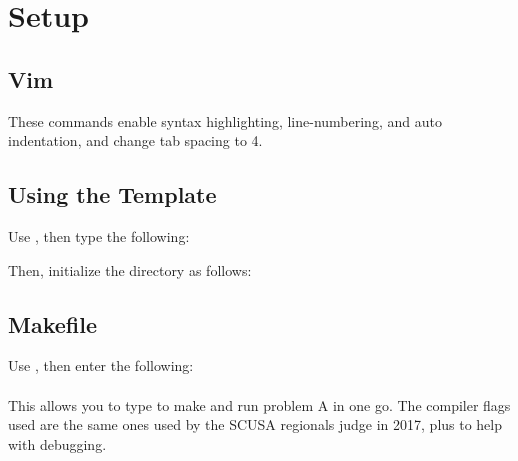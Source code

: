 \documentclass[../main]{subfiles}
\begin{document}
\section{Setup}

    \subsection{Vim}

        These commands enable syntax highlighting, line-numbering, and auto indentation, and change tab spacing to 4.


    \subsection{Using the Template}

        Use , then type the following:

        
        Then, initialize the directory as follows:\\
        

    \subsection{Makefile}
    
        Use , then enter the following:\\
        
        \\

        This allows you to type  to make and run problem A in one go. The compiler flags used are the same ones used by the SCUSA regionals judge in 2017, plus  to help with debugging.
\end{document}
